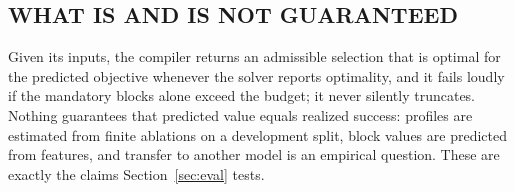 \subsection{WHAT IS AND IS NOT GUARANTEED}
Given its inputs, the compiler returns an admissible selection that is optimal for the predicted objective whenever the
solver reports optimality, and it fails loudly if the mandatory blocks alone exceed the budget; it never silently
truncates. Nothing guarantees that predicted value equals realized success: profiles are estimated from finite ablations
on a development split, block values are predicted from features, and transfer to another model is an empirical
question. These are exactly the claims Section~\ref{sec:eval} tests.
